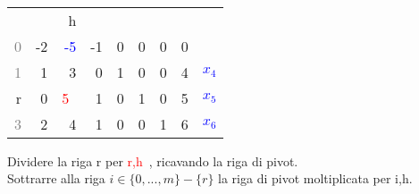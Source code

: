 \documentclass{article}
\begin{document}
\begin{preview}
                \paragraph{}
                \begin{minipage}[c]{0.4 \linewidth}
                        \begin{tabular}{r | r r r r r r | r | r}
                                \multicolumn{1}{r}{} & & h & & & & \multicolumn{2}{r}{} &  \\
                                \cline{2-8}
                                \textcolor{gray}{0} & -2 & \textcolor{blue}{-5} & -1 & 0 & 0 & 0 & 0 & \\
                                \cline{2-8}
                                \textcolor{gray}{1} & 1 & 3 & 0 & 1 & 0 & 0 & 4 & \textcolor{blue}{ $ x_4 $ } \\
                                r & 0 & \textcolor{red}{ 5 } & 1 & 0 & 1 & 0 & 5 & \textcolor{blue}{$ x_5 $ } \\
                                \textcolor{gray}{3} & 2 & 4 & 1 & 0 & 0 & 1 & 6 & \textcolor{blue}{$ x_6 $ } \\
                                \cline{2-8}
                        \end{tabular}
                \end{minipage}
                \begin{minipage}[c]{0.5 \linewidth}
                        { \scriptsize Dividere la riga r per \textcolor{red}{ r,h }, ricavando la riga di pivot.\\
                                Sottrarre alla riga $i \in \{0, ..., m\} - \{r\} $ la riga di pivot moltiplicata per i,h.
                        }
                \end{minipage}


\end{preview}
\end{document}
